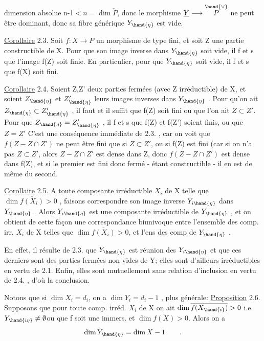 
dimension absolue n-1$< n = \dim \check{P}$, donc le morphisme $\underline{Y}\longrightarrow \overset{\hand{\vee}}{P}$ ne peut être dominant,
donc sa fibre générique $Y_{\hand{\eta}}$ est vide.

\uline{Corollaire} 2.3. Soit $f:X\longrightarrow P$ un morphisme de type fini, et soit Z une
partie constructible de X. Pour que son image inverse dans $Y_{\hand{\eta}}$ soit vide,
il f et s que l'image f(Z) soit finie. En particulier, pour que  $Y_{\hand{\eta}}$ soit
vide, il f et s que f(X) soit fini.

\uline{Corollaire} 2.4. Soient Z,Z' deux parties fermées (avec Z irréductible) de X,
et soient $Z_{\hand{\eta}}$ et $Z'_{\hand{\eta}}$ leurs images inverses dans $Y_{\hand{\eta}}$ . Pour qu'on ait
$Z_{\hand{\eta}}\subset Z'_{\hand{\eta}}$ , il faut et il suffit que f(Z) soit fini ou que l'on ait $Z\subset Z'$.
Pour que $Z_{\hand{\eta}} = Z'_{\hand{\eta}}$ , il f et s que  f(Z) et f(Z') soient finis, ou que $Z=Z'$
 C'est une conséquence 
 immédiate de 2.3. , car on voit que $f(Z - Z\cap Z')$ ne peut être fini
que si $Z\subset Z'$, ou si f(Z) est fini (car si on n'a pas $Z\subset Z'$, alors $Z-Z\cap Z'$
est dense dans Z, donc $f(Z-Z\cap Z')$ est dense dans f(Z), et si le premier
est fini donc fermé - étant constructible - il en est de même du second.

\uline{Corollaire} 2.5. A toute composante irréductible $X_i$ de X telle que
$\dim \overline{f(X_i)} > 0$ , faisons correspondre  son image inverse $Y_{i\hand{\eta}}$ dans
$Y_{\hand{\eta}}$ . Alors $Y_{i\hand{\eta}}$ est une composante irréductible de $Y_{\hand{\eta}}$ , et on obtient de
cette façon une correspondance biunivoque entre l'ensemble des comp. irr.
$X_i$ de X telles que $\dim \overline{f(X_i)}> 0$, et l'ens des comp  de $Y_{\hand{\eta}}$ .

En effet, il résulte de 2.3. que  $Y_{\hand{\eta}}$ est réunion des $Y_{i\hand{\eta}}$ 
et que ces derniers sont des parties fermées non vides de Y; elles sont
d'ailleurs irréductibles en vertu de 2.1. Enfin, elles sont mutuellement
sans relation d'inclusion en vertu de 2.4. , d'où la conclusion.

Notons que si  $\dim X_i$$= d_i$,  on a $\dim Y_i = d_i-1$ ,  plus générale:
\uline{Proposition} 2.6. Supposons que pour toute comp. irréd. $X_i$ de X on ait $\dim \overline{f(X_{\hand{i}})} > 0$ i.e. $Y_{\hand{i\eta}} \neq \emptyset$ou que f soit une immers. et $\dim \overline{f(X)}>0$. Alors on a
\[ \dim Y_{\hand{\eta}} = \dim X - 1 \qquad . \]

